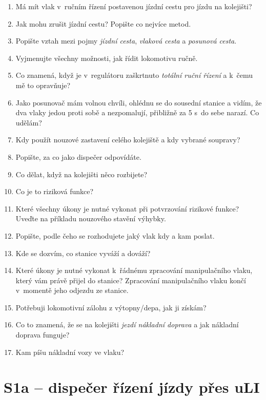 \documentclass[12pt,a4paper]{article}
\begin{document}
\begin{enumerate}[leftmargin=*]
\item Má mít vlak v~ručním řízení postavenou jízdní cestu pro jízdu na
kolejišti?
\item Jak mohu zrušit jízdní cestu? Popište co nejvíce metod.
\item Popište vztah mezi pojmy \textit{jízdní cesta}, \textit{vlaková cesta} a
\textit{posunová cesta}.

\item Vyjmenujte všechny možnosti, jak řídit lokomotivu ručně.
\item Co znamená, když je v~regulátoru zaškrtnuto \textit{totální ruční řízení}
a k~čemu mě to opravňuje?

\item Jako posunovač mám volnou chvíli, ohlédnu se do sousední stanice a vidím,
že dva vlaky jedou proti sobě a nezpomalují, přibližně za 5 s~do sebe narazí.
Co udělám?
\item Kdy použít nouzové zastavení celého kolejiště a kdy vybrané soupravy?

\item Popište, za co jako dispečer odpovídáte.
\item Co dělat, když na kolejišti něco rozbijete?

\item Co je to riziková funkce?
\item Které všechny úkony je nutné vykonat při potvrzování rizikové funkce?
Uveďte na příkladu nouzového stavění výhybky.

\item Popište, podle čeho se rozhodujete jaký vlak kdy a kam poslat.
\item Kde se dozvím, co stanice vyváží a dováží?
\item Které úkony je nutné vykonat k~řádnému zpracování manipulačního vlaku,
který vám právě přijel do stanice? Zpracování manipulačního vlaku končí
v~momentě jeho odjezdu ze stanice.
\item Potřebuji lokomotivní zálohu z výtopny/depa, jak ji získám?
\item Co to znamená, že se na kolejišti \textit{jezdí nákladní doprava} a jak
nákladní doprava funguje?
\item Kam píšu nákladní vozy ve vlaku?

\end{enumerate}

\newpage
\section*{S1a – dispečer řízení jízdy přes uLI}
\end{document}
